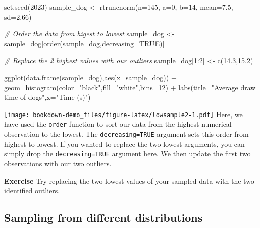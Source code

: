 \documentclass[
]{book}
\newenvironment{Shaded}{\begin{snugshade}}{\end{snugshade}}
\newcommand{\AttributeTok}[1]{\textcolor[rgb]{0.77,0.63,0.00}{#1}}
\newcommand{\CommentTok}[1]{\textcolor[rgb]{0.56,0.35,0.01}{\textit{#1}}}
\newcommand{\ConstantTok}[1]{\textcolor[rgb]{0.00,0.00,0.00}{#1}}
\newcommand{\DecValTok}[1]{\textcolor[rgb]{0.00,0.00,0.81}{#1}}
\newcommand{\FloatTok}[1]{\textcolor[rgb]{0.00,0.00,0.81}{#1}}
\newcommand{\FunctionTok}[1]{\textcolor[rgb]{0.00,0.00,0.00}{#1}}
\newcommand{\NormalTok}[1]{#1}
\newcommand{\OtherTok}[1]{\textcolor[rgb]{0.56,0.35,0.01}{#1}}
\newcommand{\SpecialCharTok}[1]{\textcolor[rgb]{0.00,0.00,0.00}{#1}}
\newcommand{\StringTok}[1]{\textcolor[rgb]{0.31,0.60,0.02}{#1}}
\begin{document}
\begin{Shaded}
\begin{Highlighting}[]
\FunctionTok{set.seed}\NormalTok{(}\DecValTok{2023}\NormalTok{)}
\NormalTok{sample\_dog }\OtherTok{\textless{}{-}} \FunctionTok{rtruncnorm}\NormalTok{(}\AttributeTok{n=}\DecValTok{145}\NormalTok{, }\AttributeTok{a=}\DecValTok{0}\NormalTok{, }\AttributeTok{b=}\DecValTok{14}\NormalTok{, }\AttributeTok{mean=}\FloatTok{7.5}\NormalTok{, }\AttributeTok{sd=}\FloatTok{2.66}\NormalTok{)}

\CommentTok{\# Order the data from higest to lowest}
\NormalTok{sample\_dog }\OtherTok{\textless{}{-}}\NormalTok{ sample\_dog[}\FunctionTok{order}\NormalTok{(sample\_dog,}\AttributeTok{decreasing=}\ConstantTok{TRUE}\NormalTok{)]}

\CommentTok{\# Replace the 2 highest values with our outliers}
\NormalTok{sample\_dog[}\DecValTok{1}\SpecialCharTok{:}\DecValTok{2}\NormalTok{] }\OtherTok{\textless{}{-}} \FunctionTok{c}\NormalTok{(}\FloatTok{14.3}\NormalTok{,}\FloatTok{15.2}\NormalTok{)}

\FunctionTok{ggplot}\NormalTok{(}\FunctionTok{data.frame}\NormalTok{(sample\_dog),}\FunctionTok{aes}\NormalTok{(}\AttributeTok{x=}\NormalTok{sample\_dog)) }\SpecialCharTok{+} \FunctionTok{geom\_histogram}\NormalTok{(}\AttributeTok{color=}\StringTok{"black"}\NormalTok{,}\AttributeTok{fill=}\StringTok{"white"}\NormalTok{,}\AttributeTok{bins=}\DecValTok{12}\NormalTok{) }\SpecialCharTok{+} 
            \FunctionTok{labs}\NormalTok{(}\AttributeTok{title=}\StringTok{"Average draw time of dogs"}\NormalTok{,}\AttributeTok{x=}\StringTok{"Time (s)"}\NormalTok{)}
\end{Highlighting}
\end{Shaded}

\texttt{[image: bookdown-demo\_files/figure-latex/lowsample2-1.pdf]}
Here, we have used the \texttt{order} function to sort our data from the highest numerical observation to the lowest. The \texttt{decreasing=TRUE} argument sets this order from highest to lowest. If you wanted to replace the two lowest arguments, you can simply drop the \texttt{decreasing=TRUE} argument here. We then update the first two observations with our two outliers.

\textbf{Exercise}
Try replacing the two lowest values of your sampled data with the two identified outliers.

\hypertarget{sampling-from-different-distributions}{%
\subsection{Sampling from different distributions}\label{sampling-from-different-distributions}}
\end{document}
